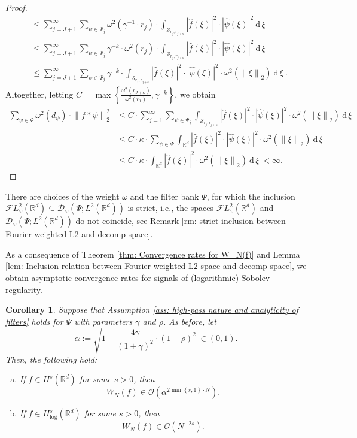 \documentclass[11pt]{amsart}
\newcommand{\R}{{\mathbb{R}}}
\newcommand{\dxi}{\:\mathrm{d}\,\xi\:}
\newcommand{\norm}[1]{\ensuremath{\left\lVert\text{}#1\text{}\right\rVert}}
\newcommand{\set}[1]{\ensuremath{\left\{\text{}#1\text{}\right\}}}
\newtheorem{corollary}[theorem]{Corollary}
\newenvironment{proof sketch} {\textit{Proof sketch.}}{}
\begin{document}
\begin{proof}
\begin{align*}
      &\leq \sum_{j=J+1}^\infty \sum_{\psi \in \Psi_j} \omega^{2}(\gamma^{-1}\cdot r_{j}) \cdot \int_{\mathcal{S}_{r_j,r_{j+\kappa}}} |\widehat{f}(\xi)|^2 \cdot |\widehat{\psi}(\xi)|^2 \dxi \\
      &\leq \sum_{j=J+1}^\infty \sum_{\psi \in \Psi_j} \gamma^{-k} \cdot \omega^{2}(r_{j}) \cdot \int_{\mathcal{S}_{r_j,r_{j+\kappa}}} |\widehat{f}(\xi)|^2 \cdot |\widehat{\psi}(\xi)|^2 \dxi \\
      &\leq \sum_{j=J+1}^\infty \sum_{\psi \in \Psi_j} \gamma^{-k} \cdot \int_{\mathcal{S}_{r_j,r_{j+\kappa}}} |\widehat{f}(\xi)|^2 \cdot |\widehat{\psi}(\xi)|^2 \cdot \omega^2(\norm{\xi}_2) \dxi.
    \end{align*}
    Altogether, letting $C=\max\set{\frac{\omega^{2}(r_{J+\kappa})}{\omega^2(r_1)}, \gamma^{-k}}$, we obtain
    \begin{align*}
      \sum_{\psi \in \Psi} \omega^{2}(d_\psi) \cdot \norm{f*\psi}_2^2 &\leq C \cdot \sum_{j=1}^\infty \sum_{\psi \in \Psi_j} \int_{\mathcal{S}_{r_j,r_{j+\kappa}}} |\widehat{f}(\xi)|^2 \cdot |\widehat{\psi}(\xi)|^2 \cdot \omega^2(\norm{\xi}_2) \dxi \\
      &\leq C \cdot \kappa \cdot \sum_{\psi \in \Psi} \int_{\R^d} |\widehat{f}(\xi)|^2 \cdot |\widehat{\psi}(\xi)|^2 \cdot \omega^2(\norm{\xi}_2) \dxi \\
      &\leq  C \cdot \kappa \cdot \int_{\R^d} |\widehat{f}(\xi)|^2 \cdot \omega^2(\norm{\xi}_2) \dxi < \infty.
    \end{align*}
  \end{proof}
  
  There are choices of the weight $\omega$ and the filter bank $\Psi$, for which the inclusion $\mathcal{F}L_\omega^2(\R^d)\subseteq \mathcal{D}_\omega(\Psi;L^2(\R^d))$ is strict, i.e., the spaces $\mathcal{F}L_\omega^2(\R^d)$ and $\mathcal{D}_\omega(\Psi;L^2(\R^d))$ do not coincide, see Remark \ref{rm: strict inclusion between Fourier weighted L2 and decomp space}. 
  
  As a consequence of Theorem \ref{thm: Convergence rates for W_N(f)} and Lemma \ref{lem: Inclusion relation between Fourier-weighted L2 space and decomp space}, we obtain asymptotic convergence rates for signals of (logarithmic) Sobolev regularity.
  
  \begin{corollary}\label{cor: Decay rates for (Log)Sobolev functions}
    Suppose that Assumption \ref{ass: high-pass nature and analyticity of filters} holds for $\Psi$ with parameters $\gamma$ and $\rho$. 
    As before, let 
    \[\alpha:=\sqrt{1-\frac{4\gamma}{(1+\gamma)^2}\cdot (1-\rho)^2} \: \in (0,1).\] 
    Then, the following hold:
    \begin{enumerate}[a)]
      \item If $f \in H^s(\R^d)$ for some $s>0$, then 
      \[W_N(f) \in \mathcal{O}(\alpha^{2\min\set{s,1}\cdot N}).\] 
      \item If $f \in H^s_{\log}(\R^d)$ for some $s>0$, then 
      \[W_N(f)\in \mathcal{O}(N^{-2s}).\] 
    \end{enumerate}
  \end{corollary}
  
\end{document}
